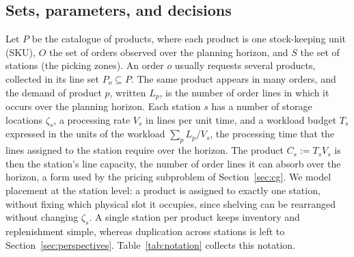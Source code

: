 \documentclass[]{interact}
\begin{document}
\subsection{Sets, parameters, and decisions}
Let $P$ be the catalogue of products, where each product is one stock-keeping unit (SKU), $O$ the set of orders observed over the planning horizon, and $S$ the set of stations (the picking zones). An order $o$ usually requests several products, collected in its line set $P_o \subseteq P$. The same product appears in many orders, and the demand of product $p$, written $L_p$, is the number of order lines in which it occurs over the planning horizon. Each station $s$ has a number of storage locations $\zeta_s$, a processing rate $V_s$ in lines per unit time, and a workload budget $T_s$ expressed in the units of the workload $\sum_{p} L_p/V_s$, the processing time that the lines assigned to the station require over the horizon. The product $C_s := T_s V_s$ is then the station's line capacity, the number of order lines it can absorb over the horizon, a form used by the pricing subproblem of Section~\ref{sec:cg}. We model placement at the station level: a product is assigned to exactly one station, without fixing which physical slot it occupies, since shelving can be rearranged without changing $\zeta_s$. A single station per product keeps inventory and replenishment simple, whereas duplication across stations is left to Section~\ref{sec:perspectives}. Table~\ref{tab:notation} collects this notation.
\end{document}
